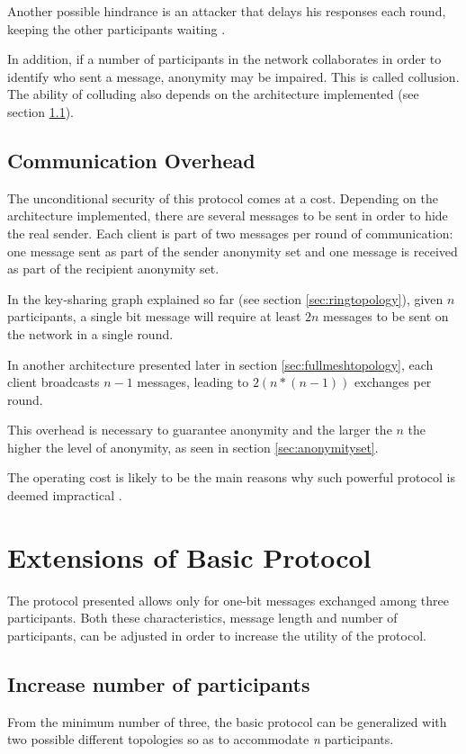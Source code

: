 Another possible hindrance is an attacker that delays his responses each round, keeping the other participants waiting \cite{Fischer}.

In addition, if a number of participants in the network collaborates in order to identify who sent a message, anonymity may be impaired. This is called collusion. The ability of colluding also depends on the architecture implemented (see section \ref{sec:participantsextention}).

\subsection{Communication Overhead} \label{sec:complexitylimitation}
The unconditional security of this protocol comes at a cost. Depending on the architecture implemented, there are several messages to be sent in order to hide the real sender. Each client is part of two messages per round of communication: one message sent as part of the sender anonymity set and one message is received as part of the recipient anonymity set.

In the key-sharing graph explained so far (see section \ref{sec:ringtopology}), given $n$ participants, a single bit message will require at least $2n$ messages to be sent on the network in a single round. 

In another architecture presented later in section \ref{sec:fullmeshtopology}, each client broadcasts $n-1$ messages, leading to $2(n * (n - 1))$ exchanges per round.

This overhead is necessary to guarantee anonymity and the larger the $n$ the higher the level of anonymity, as seen in section \ref{sec:anonymityset}. 

The operating cost is likely to be the main reasons why such powerful protocol is deemed impractical \cite{Scholz}.


\section{Extensions of Basic Protocol}
The protocol presented allows only for one-bit messages exchanged among three participants. Both these characteristics, message length and number of participants, can be adjusted in order to increase the utility of the protocol. 

\subsection{Increase number of participants} \label{sec:participantsextention}
From the minimum number of three, the basic protocol can be generalized with two possible different topologies so as to accommodate \textit{n} participants. 

